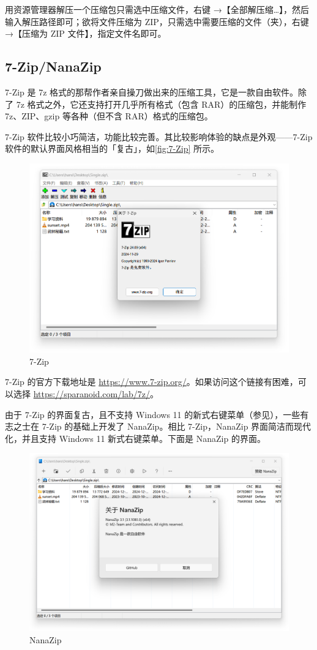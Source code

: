 {用资源管理器解压一个压缩包只需选中压缩文件，右键 →【全部解压缩…】，然后输入解压路径即可；欲将文件压缩为 ZIP，只需选中需要压缩的文件（夹），右键 →【压缩为 ZIP 文件】，指定文件名即可。

\subsection{7-Zip/NanaZip}

7-Zip 是 7z 格式的那帮作者亲自操刀做出来的压缩工具，它是一款自由软件。除了 7z 格式之外，它还支持打开几乎所有格式（包含 RAR）的压缩包，并能制作 7z、ZIP、gzip 等各种（但不含 RAR）格式的压缩包。

7-Zip 软件比较小巧简洁，功能比较完善。其比较影响体验的缺点是外观——7-Zip 软件的默认界面风格相当的「复古」，如\autoref{fig:7-Zip} 所示。

\begin{figure}[htb!]
  \centering
  \includegraphics[width=.65\textwidth]{assets/software/7-Zip.png}
  \caption{7-Zip}
  \label{fig:7-Zip}
\end{figure}

7-Zip 的官方下载地址是 \url{https://www.7-zip.org/}。如果访问这个链接有困难，可以选择 \url{https://sparanoid.com/lab/7z/}。

由于 7-Zip 的界面复古，且不支持 Windows 11 的新式右键菜单（参见），一些有志之士在 7-Zip 的基础上开发了 NanaZip。相比 7-Zip，NanaZip 界面简洁而现代化，并且支持 Windows 11 新式右键菜单。下面是 NanaZip 的界面。

\begin{figure}[htb!]
  \centering
  \includegraphics[width=.7\textwidth]{assets/software/NanaZip.png}
  \caption{NanaZip}
  \label{fig:NanaZip}
\end{figure}

}
